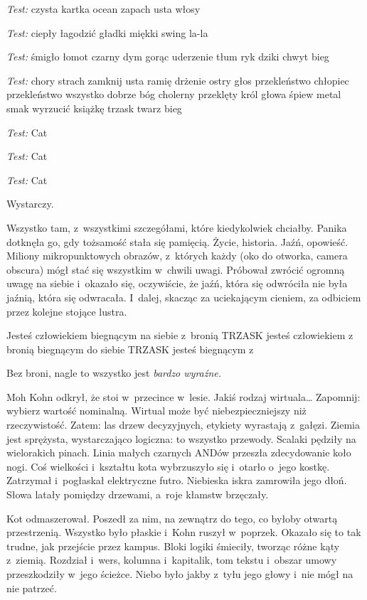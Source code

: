 \documentclass[oneside,polish,11pt,sfheadings]{mwbk}
\begin{document}
\emph{Test:} czysta kartka ocean zapach usta włosy

\emph{Test:} ciepły łagodzić gładki miękki swing la-la

\emph{Test:} śmigło łomot czarny dym gorąc uderzenie tłum ryk dziki
chwyt bieg

\emph{Test:} chory strach zamknij usta ramię drżenie ostry głos
przekleństwo chłopiec przekleństwo wszystko dobrze bóg cholerny
przeklęty król głowa śpiew metal smak wyrzucić książkę trzask twarz bieg

\emph{Test:} Cat

\emph{Test:} Cat

\emph{Test:} Cat

Wystarczy.

Wszystko tam, z~wszystkimi szczegółami, które kiedykolwiek chciałby.
Panika dotknęła go, gdy tożsamość stała się pamięcią. Życie, historia.
Jaźń, opowieść. Miliony mikropunktowych obrazów, z~których każdy (oko do
otworka, camera obscura) mógł stać się wszystkim w~chwili uwagi.
Próbował zwrócić ogromną uwagę na siebie i~okazało się, oczywiście, że
jaźń, która się odwróciła nie była jaźnią, która się odwracała. I~dalej,
skacząc za uciekającym cieniem, za odbiciem przez kolejne stojące
lustra.

Jesteś człowiekiem biegnącym na siebie z~bronią TRZASK jesteś człowiekiem
z bronią biegnącym do siebie TRZASK jesteś biegnącym z

Bez broni, nagle to wszystko jest \emph{bardzo wyraźne.}

Moh Kohn odkrył, że stoi w~przecince w~lesie. Jakiś rodzaj wirtuala\ldots
Zapomnij: wybierz wartość nominalną. Wirtual może być niebezpieczniejszy
niż rzeczywistość. Zatem: las drzew decyzyjnych, etykiety wyrastają z~gałęzi. Ziemia jest sprężysta, wystarczająco logiczna: to wszystko
przewody. Scalaki pędziły na wielorakich pinach. Linia małych czarnych
ANDów przeszła zdecydowanie koło nogi. Coś wielkości i~kształtu kota
wybrzuszyło się i~otarło o~jego kostkę. Zatrzymał i~pogłaskał
elektryczne futro. Niebieska iskra zamrowiła jego dłoń. Słowa latały
pomiędzy drzewami, a~roje kłamstw brzęczały.

Kot odmaszerował. Poszedł za nim, na zewnątrz do tego, co byłoby otwartą
przestrzenią. Wszystko było płaskie i~Kohn ruszył w~poprzek. Okazało się
to tak trudne, jak przejście przez kampus. Bloki logiki śmieciły,
tworząc różne kąty z~ziemią. Rozdział i~wers, kolumna i~kapitalik, tom
tekstu i~obszar umowy przeszkodziły w~jego ścieżce. Niebo było jakby z~tyłu jego głowy i~nie mógł na nie patrzeć.
\end{document}
